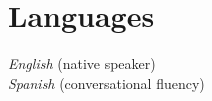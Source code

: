 \documentclass[10pt, a4paper]{article}
\begin{document}
\section*{Languages}
\textit{English} (native speaker)\\
\textit{Spanish} (conversational fluency)


\end{document}
